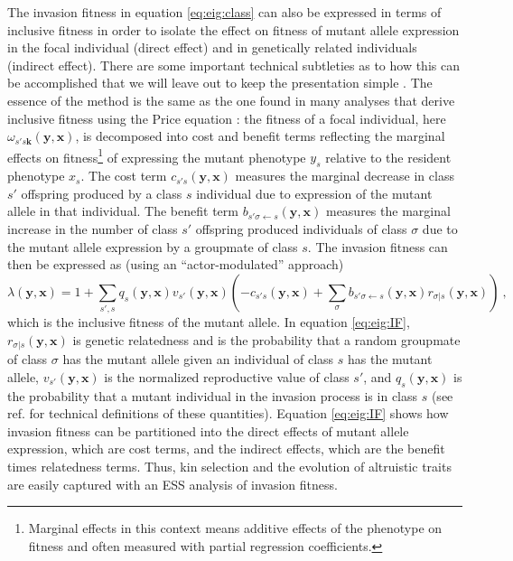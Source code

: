 \documentclass[11pt]{article}
\renewcommand{\vec}[1]{\symbf{#1}}
\newcommand{\eig}{\lambda}
\begin{document}
The invasion fitness in equation \eqref{eq:eig:class} can also be expressed in terms of inclusive fitness in order to isolate the effect on fitness of mutant allele expression in the focal individual (direct effect) and in genetically related individuals (indirect effect). There are some important technical subtleties as to how this can be accomplished that we will leave out to keep the presentation simple \cite[see ``Supplement B'' in ref. ][for details]{Lehmann:Rousset:2020}. The essence of the method is the same as the one found in many analyses that derive inclusive fitness using the Price equation \cite[e.g.,][]{Queller:1992,Frank:1998,Lehmann:Keller:2006,Akcay:VanCleve:2012}: the fitness of a focal individual, here $\omega_{s's\vec{k}}(\vec{y}, \vec{x})$, is decomposed into cost and benefit terms reflecting the marginal effects on fitness\footnote{Marginal effects in this context means additive effects of the phenotype on fitness and often measured with partial regression coefficients.} of expressing the mutant phenotype $y_{s}$ relative to the resident phenotype $x_{s}$. The cost term $c_{s's}(\vec{y}, \vec{x})$ measures the marginal decrease in class $s'$ offspring produced by a class $s$ individual due to expression of the mutant allele in that individual. The benefit term $b_{s'\sigma \leftarrow s}(\vec{y}, \vec{x})$ measures the marginal increase in the number of class $s'$ offspring produced individuals of class $\sigma$ due to the mutant allele expression by a groupmate of class $s$. The invasion fitness can then be expressed as (using an ``actor-modulated'' approach) \cite{Lehmann:Rousset:2020}
\begin{equation}
  \label{eq:eig:IF}
  \eig(\vec{y}, \vec{x}) = 1 + \sum_{s',s} q_{s}(\vec{y}, \vec{x}) v_{s'}(\vec{y}, \vec{x})
  \left( - c_{s's}(\vec{y}, \vec{x}) + \sum_{\sigma} b_{s'\sigma \leftarrow s}(\vec{y}, \vec{x}) r_{\sigma|s}(\vec{y}, \vec{x}) \right) \: ,
\end{equation}
which is the inclusive fitness \cite{Hamilton:1964} of the mutant allele. In equation \eqref{eq:eig:IF}, $r_{\sigma|s}(\vec{y}, \vec{x})$ is genetic relatedness and is the probability that a random groupmate of class $\sigma$ has the mutant allele given an individual of class $s$ has the mutant allele, $v_{s'}(\vec{y}, \vec{x})$ is the normalized reproductive value of class $s'$, and $q_{s}(\vec{y}, \vec{x})$ is the probability that a mutant individual in the invasion process is in class $s$ (see ref. \cite{Lehmann:Rousset:2020} for technical definitions of these quantities). Equation \eqref{eq:eig:IF} shows how invasion fitness can be partitioned into the direct effects of mutant allele expression, which are cost terms, and the indirect effects, which are the benefit times relatedness terms. Thus, kin selection and the evolution of altruistic traits are easily captured with an ESS analysis of invasion fitness.
\end{document}
